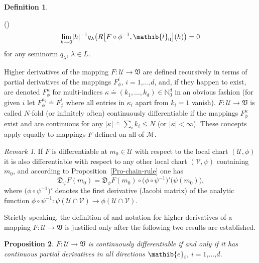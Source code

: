 \documentclass[11pt,twoside,openright]{report}
\theoremstyle{definition}
\newtheorem{Def}{Definition}[chapter]
\theoremstyle{plain}
\newtheorem{Pro}[Def]{Proposition}
\theoremstyle{remark}
\newtheorem*{Rem}{Remark}
\theoremstyle{assumption}
\newcommand{\abs}[1]{\lvert #1 \rvert}
\newcommand{\ql}{q_\lambda}
\newcommand{\bqlx}[1]{q_\lambda \bigl( #1 \bigr)}
\newcommand{\Nbb}{\mathbb{N}}
\newcommand{\Dfrak}{\mathfrak{D}}
\newcommand{\Vfrak}{\mathfrak{V}}
\newcommand{\eib}{\mathib{e}}
\newcommand{\tib}{\mathib{t}}
\newcommand{\Mscr}{\mathscr{M}}
\newcommand{\Uscr}{\mathscr{U}}
\newcommand{\Vscr}{\mathscr{V}}
\newcounter{defitem}
\newenvironment{deflist}{\begin{list}{(\alph{defitem})}%
  {\usecounter{defitem} \setlength{\topsep}{0ex}%
   \setlength{\parsep}{0.2ex} \setlength{\itemsep}{0.4ex}%
   \setlength{\leftmargin}{0em} \setlength{\itemindent}{0.5em}%
   }}{\end{list}}
\begin{document}
\begin{Def}
\begin{deflist}
\begin{subequations}
\begin{equation}
        \label{eq-diff-partial-residual}
        \lim_{h \rightarrow 0} \abs{h}^{-1} \bqlx{R \bigl[ F \circ
        \phi^{-1} , \tib_0 \bigr] ( h )} = 0 
      \end{equation}
    \end{subequations}
    for any seminorm $\ql$, $\lambda \in L$.
  \item Higher derivatives of the mapping $F : \Uscr \rightarrow
    \Vfrak$ are defined recursively in terms of partial derivatives of
    the mappings $F_\phi^i$, $i = 1 \text{,} \dots \text{,} d$, and,
    if they happen to exist, are denoted $F_\phi^\kappa$ for
    multi-indices $\kappa \doteq ( k_1 , \dots , k_d ) \in \Nbb_0^d$
    in an obvious fashion (for given $i$ let $F_\phi^{\kappa_i} \doteq
    F_\phi^i$ where all entries in $\kappa_i$ apart from $k_i = 1$
    vanish). $F : \Uscr \rightarrow \Vfrak$ is called $N$-fold (or
    infinitely often) continuously differentiable if the mappings
    $F_\phi^\kappa$ exist and are continuous for any $\abs{\kappa}
    \doteq \sum_i k_i \leqslant N$ (or $\abs{\kappa} < \infty$). These
    concepts apply equally to mappings $F$ defined on all of $\Mscr$.
  \end{deflist}
\end{Def}
\begin{Rem}
  If $F$ is differentiable at $m_0 \in \Uscr$ with respect to the
  local chart $( \Uscr , \phi )$ it is also differentiable with
  respect to any other local chart $( \Vscr , \psi )$ containing
  $m_0$, and according to Proposition~\ref{Pro-chain-rule} one has
  \begin{equation}
    \label{eq-diff-different-charts}
    \Dfrak_\psi F ( m_0 ) = \Dfrak_\phi F ( m_0 ) \circ \bigl( \phi
    \circ \psi^{-1} \bigr)' \bigl( \psi ( m_0 ) \bigr) \text{,}
  \end{equation}
  where $\bigl( \phi \circ \psi^{-1} \bigr)'$ denotes the first
  derivative (Jacobi matrix) of the analytic function $ \phi \circ 
  \psi^{-1} : \psi ( \Uscr \cap \Vscr ) \rightarrow \phi ( \Uscr \cap
  \Vscr )$. 
\end{Rem}
Strictly speaking, the definition of and notation for higher
derivatives of a mapping $F : \Uscr \rightarrow \Vfrak$ is justified
only after the following two results are established.
\begin{Pro}
  $F : \Uscr \rightarrow \Vfrak$ is continuously differentiable if and
  only if it has continuous  partial derivatives in all directions
  $\eib_i$, $i = 1 \text{,} \dots \text{,} d$.
\end{Pro}
\end{document}

